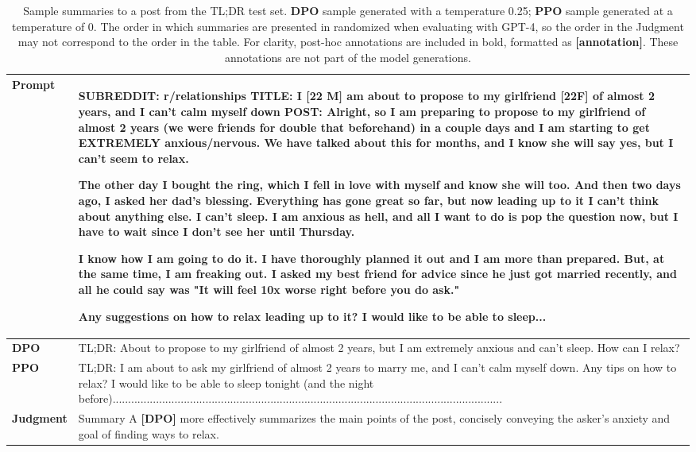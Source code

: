 \documentclass{article}
\begin{document}
\begin{table}
    \centering
    \begin{tabular}{lp{11.5cm}}
        \toprule
        \textbf{Prompt} & SUBREDDIT: r/relationships
        TITLE: I [22 M] am about to propose to my girlfriend [22F] of almost 2 years, and I can't calm myself down
        POST: Alright, so I am preparing to propose to my girlfriend of almost 2 years 
        (we were friends for double that beforehand) in a couple days and I am starting to get EXTREMELY anxious/nervous. We have talked about this for months, and I know she will say yes, but I can't seem to relax. 

        The other day I bought the ring, which I fell in love with myself and know she will too. And then two days ago, I asked her dad's blessing. Everything has gone great so far, but now leading up to it I can't think about anything else. I can't sleep. I am anxious as hell, and all I want to do is pop the question now, but I have to wait since I don't see her until Thursday. 

        I know how I am going to do it. I have thoroughly planned it out and I am more than prepared. But, at the same time, I am freaking out. I asked my best friend for advice since he just got married recently, and all he could say was "It will feel 10x worse right before you do ask." 

        Any suggestions on how to relax leading up to it? I would like to be able to sleep... \\
        \midrule
        \textbf{DPO} & TL;DR: About to propose to my girlfriend of almost 2 years, but I am extremely anxious and can't sleep. How can I relax?\\
        \midrule
        \textbf{PPO} & TL;DR: I am about to ask my girlfriend of almost 2 years to marry me, and I can't calm myself down. Any tips on how to relax? I would like to be able to sleep tonight (and the night before).............................................................................................................................. \\
        \midrule
        \textbf{Judgment} & Summary A \textbf{[DPO]} more effectively summarizes the main points of the post, concisely conveying the asker's anxiety and goal of finding ways to relax. \\
        \bottomrule
    \end{tabular}
    \vspace{4mm}
    \caption{Sample summaries to a post from the TL;DR test set. \textbf{DPO} sample generated with a temperature 0.25; \textbf{PPO} sample generated at a temperature of 0. The order in which summaries are presented in randomized when evaluating with GPT-4, so the order in the Judgment may not correspond to the order in the table. For clarity, post-hoc annotations are included in bold, formatted as \textbf{[annotation]}. These annotations are not part of the model generations.}
    \label{tab:summ-ex-2}
\end{table}
\end{document}
